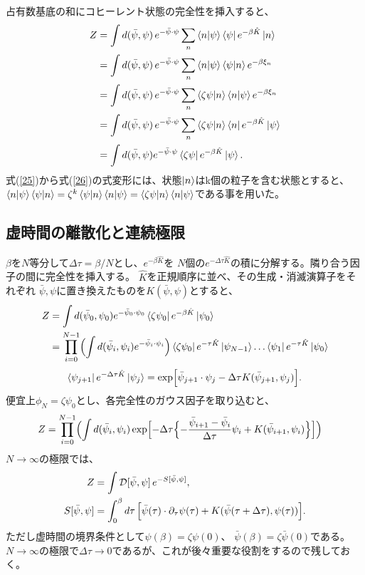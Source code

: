\documentclass[a4paper,12pt]{jsarticle}
\begin{document}
占有数基底の和にコヒーレント状態の完全性を挿入すると、
\begin{align}
  Z &= \int d(\bar\psi,\psi)\,e^{-\bar\psi\cdot\psi} \sum_{n}\braket{n}{\psi}\bra{\psi}e^{-\beta\hat K}\ket{n} \\
  &= \int d(\bar\psi,\psi)\,e^{-\bar\psi\cdot\psi} \sum_{n}\braket{n}{\psi}\braket{\psi}{n}e^{-\beta\xi_n} \label{25}\\
  &= \int d(\bar\psi,\psi)\,e^{-\bar\psi\cdot\psi} \sum_{n}\braket{\zeta\psi}{n}\braket{n}{\psi}e^{-\beta\xi_n} \label{26}\\
  &= \int d(\bar\psi,\psi)\,e^{-\bar\psi\cdot\psi} \sum_{n}\braket{\zeta\psi}{n}\bra{n}e^{-\beta\hat K}\ket{\psi} \\
  &= \int d(\bar\psi,\psi) e^{-\bar\psi\cdot\psi} \bra{\zeta\psi}e^{-\beta\hat K}\ket{\psi}.
\end{align}
式(\ref{25})から式(\ref{26})の式変形には、状態$\ket{n}$はk個の粒子を含む状態とすると、$\braket{n}{\psi}\braket{\psi}{n} = \zeta^k\braket{\psi}{n}\braket{n}{\psi} = \braket{\zeta\psi}{n}\braket{n}{\psi}$である事を用いた。

\subsection{虚時間の離散化と連続極限}
$\beta$を$N$等分して$\Delta\tau=\beta/N$とし、$e^{-\beta\hat K}$を
$N$個の$e^{-\Delta\tau\hat K}$の積に分解する。隣り合う因子の間に完全性を挿入する。
$\hat K$を正規順序に並べ、その生成・消滅演算子をそれぞれ
$\bar\psi,\psi$に置き換えたものを$K(\bar\psi,\psi)$とすると、
\begin{align}
  Z &= \int d(\bar\psi_0,\psi_0) e^{-\bar\psi_0\cdot\psi_0} \bra{\zeta\psi_0}e^{-\beta\hat K}\ket{\psi_0} \\
  &= \prod_{i=0}^{N-1}\Bigl(\int d(\bar\psi_i,\psi_i) e^{-\bar\psi_i\cdot\psi_i}\Bigr)\bra{\zeta\psi_0}e^{-\tau\hat{K}}\ket{\psi_{N-1}}\dots\bra{\psi_1}e^{-\tau\hat{K}}\ket{\psi_0}
\end{align}
\begin{align}
  \bra{\psi_{j+1}}e^{-\Delta\tau\hat K}\ket{\psi_j}
  =\exp\Bigl[\bar\psi_{j+1}\cdot\psi_j-\Delta\tau K(\bar\psi_{j+1},\psi_j)\Bigr].
\end{align}
便宜上$\phi_N = \zeta\psi_0$とし、各完全性のガウス因子を取り込むと、
\begin{align}
  Z &= \prod_{i=0}^{N-1}\Bigl(\int d(\bar\psi_i,\psi_i) \exp\Bigl[-\Delta\tau\Bigl\{-\frac{\bar{\psi}_{i+1}-\bar{\psi}_i}{\Delta\tau}\psi_i + K(\bar{\psi}_{i+1}, \psi_i) \Bigr\}\Bigr]\Bigr)
\end{align}
$N\rightarrow\infty$の極限では、
\begin{align}
  Z &= \int\mathcal D[\bar\psi,\psi]\,e^{-S[\bar\psi,\psi]},\\
  S[\bar\psi,\psi]
    &= \int_0^\beta d\tau\,\Bigl[
       \bar\psi(\tau)\cdot\partial_\tau\psi(\tau)
       +K(\bar\psi(\tau+\Delta\tau),\psi(\tau))\Bigr].\label{imagtime_action}
\end{align}
ただし虚時間の境界条件として$\psi(\beta)=\zeta\psi(0)$、
$\bar\psi(\beta)=\zeta\bar\psi(0)$である。$N\rightarrow\infty$の極限で$\Delta\tau\rightarrow0$であるが、これが後々重要な役割をするので残しておく。
\end{document}
